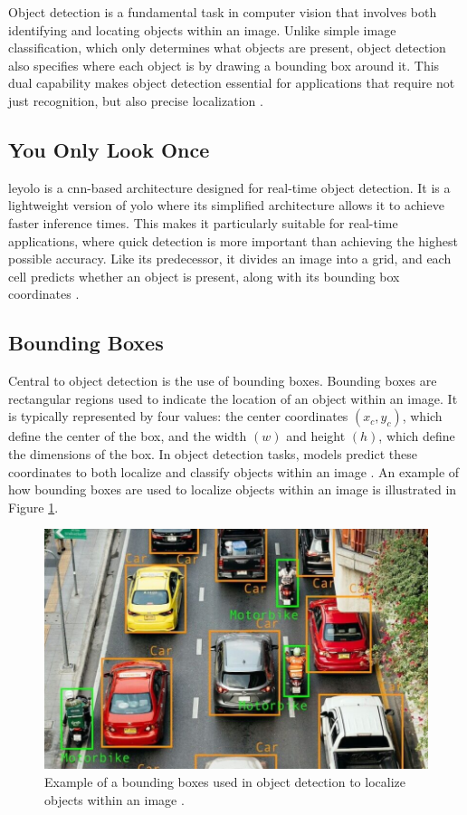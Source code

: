 Object detection is a fundamental task in computer vision that involves both identifying and locating objects within an image. Unlike simple image classification, which only determines what objects are present, object detection also specifies where each object is by drawing a bounding box around it. This dual capability makes object detection essential for applications that require not just recognition, but also precise localization \cite{ibm:object-detection}. \\

\subsection{You Only Look Once}

\gls{leyolo} is a \gls{cnn}-based architecture designed for real-time object detection. It is a lightweight version of \gls{yolo} where its simplified architecture allows it to achieve faster inference times. This makes it particularly suitable for real-time applications, where quick detection is more important than achieving the highest possible accuracy. Like its predecessor, it divides an image into a grid, and each cell predicts whether an object is present, along with its bounding box coordinates \cite{openreview:leyolo}.\\

\subsection{Bounding Boxes}

Central to object detection is the use of bounding boxes. Bounding boxes are rectangular regions used to indicate the location of an object within an image. It is typically represented by four values: the center coordinates \((x_c, y_c)\), which define the center of the box, and the width \((w)\) and height \((h)\), which define the dimensions of the box. In object detection tasks, models predict these coordinates to both localize and classify objects within an image \cite{peopleforai:boundingbox}. An example of how bounding boxes are used to localize objects within an image is illustrated in Figure \ref{fig:boundingbox}.

\begin{figure}[h!]
    \centering
    \includegraphics[width=0.75\linewidth]{figures/theory/image-recognition/bbox-example.png}
    \caption[Bounding box in object detection]{Example of a bounding boxes used in object detection to localize objects within an image \cite{peopleforai:boundingbox}.}
    \label{fig:boundingbox}
\end{figure}

